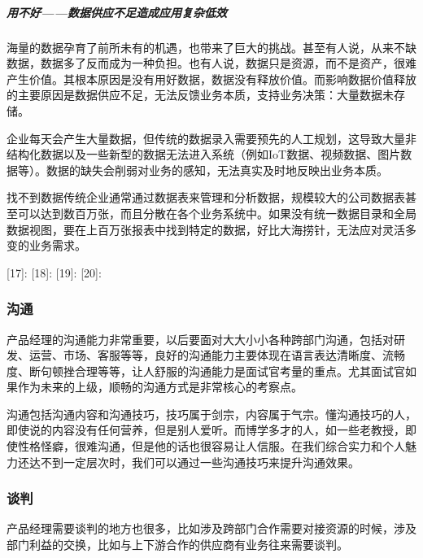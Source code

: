 \documentclass[letterpaper,11pt,english]{sphinxmanual}
\begin{document}
\subparagraph{用不好——数据供应不足造成应用复杂低效}
\label{\detokenize{chapter_idea/data:id27}}
海量的数据孕育了前所未有的机遇，也带来了巨大的挑战。甚至有人说，从来不缺数据，数据多了反而成为一种负担。也有人说，数据只是资源，而不是资产，很难产生价值。其根本原因是没有用好数据，数据没有释放价值。而影响数据价值释放的主要原因是数据供应不足，无法反馈业务本质，支持业务决策：大量数据未存储。

企业每天会产生大量数据，但传统的数据录入需要预先的人工规划，这导致大量非结构化数据以及一些新型的数据无法进入系统（例如IoT数据、视频数据、图片数据等）。数据的缺失会削弱对业务的感知，无法真实及时地反映出业务本质。

找不到数据传统企业通常通过数据表来管理和分析数据，规模较大的公司数据表甚至可以达到数百万张，而且分散在各个业务系统中。如果没有统一数据目录和全局数据视图，要在上百万张报表中找到特定的数据，好比大海捞针，无法应对灵活多变的业务需求。

{[}17{]}: {[}18{]}:
{[}19{]}:  {[}20{]}:


\subsubsection{沟通}
\label{\detokenize{chapter_idea/communicate:id1}}\label{\detokenize{chapter_idea/communicate::doc}}
产品经理的沟通能力非常重要，以后要面对大大小小各种跨部门沟通，包括对研发、运营、市场、客服等等，良好的沟通能力主要体现在语言表达清晰度、流畅度、断句顿挫合理等等，让人舒服的沟通能力是面试官考量的重点。尤其面试官如果作为未来的上级，顺畅的沟通方式是非常核心的考察点。

沟通包括沟通内容和沟通技巧，技巧属于剑宗，内容属于气宗。懂沟通技巧的人，即使说的内容没有任何营养，但是别人爱听。而博学多才的人，如一些老教授，即使性格怪癖，很难沟通，但是他的话也很容易让人信服。在我们综合实力和个人魅力还达不到一定层次时，我们可以通过一些沟通技巧来提升沟通效果。%
\begin{footnote}[325]\sphinxAtStartFootnote
{}
%
\end{footnote}


\subsubsection{谈判}
\label{\detokenize{chapter_idea/negotiation:id1}}\label{\detokenize{chapter_idea/negotiation::doc}}
产品经理需要谈判的地方也很多，比如涉及跨部门合作需要对接资源的时候，涉及部门利益的交换，比如与上下游合作的供应商有业务往来需要谈判。
\end{document}
